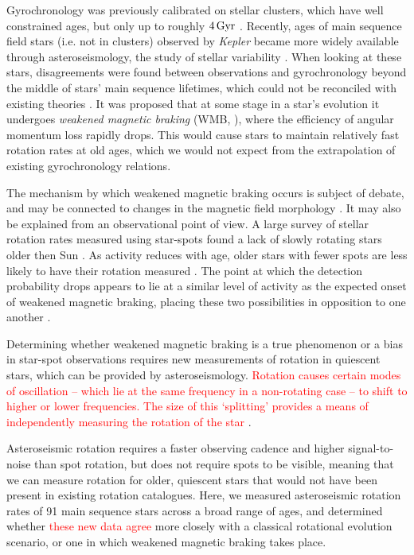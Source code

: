 \documentclass[12pt]{article}
\newcommand{\kepler}{\emph{Kepler}\xspace}
\newcommand{\rtwo}[1]{\textcolor{red}{{#1}}}
\begin{document}
Gyrochronology was previously calibrated on stellar clusters, which have well constrained ages, but only up to roughly $4\, \rm{Gyr}$ \cite{meibom+2015, barnes+2016}. Recently, ages of main sequence field stars (i.e. not in clusters) observed by \kepler \cite{borucki+2010} became more widely available through asteroseismology, the study of stellar variability \cite{silvaaguirre+2015}. When looking at these stars, disagreements were found between observations and gyrochronology beyond the middle of stars' main sequence lifetimes, which could not be reconciled with existing theories \cite{angus+2015, nielsen+2015, davies+2015}. It was proposed that at some stage in a star's evolution it undergoes \textit{weakened magnetic braking} (WMB, \cite{vansaders+2016}), where the efficiency of angular momentum loss rapidly drops. This would cause stars to maintain relatively fast rotation rates at old ages, which we would not expect from the extrapolation of existing gyrochronology relations.

The mechanism by which weakened magnetic braking occurs is subject of debate, and may be connected to changes in the magnetic field morphology \cite{vansaders+2016,reville+2015,garraffo+2016, metcalfe+2016, metcalfe+2019, see+2019}. It may also be explained from an observational point of view. A large survey of stellar rotation rates measured using star-spots found a lack of slowly rotating stars older then Sun \cite{mcquillan+2014}. As activity reduces with age, older stars with fewer spots are less likely to have their rotation measured \cite{matt+2015, reinhold+2020}. The point at which the detection probability drops appears to lie at a similar level of activity as the expected onset of weakened magnetic braking, placing these two possibilities in opposition to one another \cite{vansaders+2019}.

Determining whether weakened magnetic braking is a true phenomenon or a bias in star-spot observations requires new measurements of rotation in quiescent stars, which can be provided by asteroseismology. \rtwo{Rotation causes certain modes of oscillation -- which lie at the same frequency in a non-rotating case -- to shift to higher or lower frequencies. The size of this `splitting' provides a means of independently measuring the rotation of the star \cite{ledoux1951}}. 

Asteroseismic rotation requires a faster observing cadence and higher signal-to-noise than spot rotation, but does not require spots to be visible, meaning that we can measure rotation for older, quiescent stars that would not have been present in existing rotation catalogues. 
Here, we measured asteroseismic rotation rates of 91 main sequence stars across a broad range of  ages, and determined whether \rtwo{these new data agree} more closely with a classical rotational evolution scenario, or one in which weakened magnetic braking takes place.\\
\end{document}
